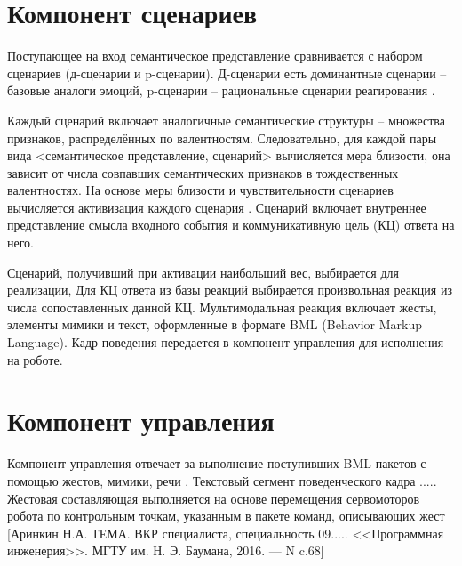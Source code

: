 \clearpage

\section{Компонент сценариев}

Поступающее на вход семантическое представление сравнивается с набором сценариев (д-сценарии и p-сценарии). Д-сценарии есть доминантные сценарии -- базовые аналоги эмоций, p-сценарии -- рациональные сценарии реагирования \cite{arch_of_the_robot_4}. 

Каждый сценарий включает аналогичные семантические структуры -- множества признаков, распределённых по валентностям. %
Следовательно, для каждой пары вида <семантическое представление, сценарий> вычисляется мера близости, она зависит от числа совпавших семантических признаков в тождественных валентностях. На основе меры близости и чувствительности сценариев вычисляется активизация каждого сценария \cite{arch_of_the_robot_5}. Сценарий включает внутреннее представление смысла входного события и коммуникативную цель (КЦ) ответа на него.

Сценарий, получивший при активации наибольший вес, выбирается для реализации, Для КЦ ответа из базы реакций выбирается произвольная реакция из числа сопоставленных данной КЦ. Мультимодальная реакция включает жесты, элементы мимики и текст, оформленные в формате BML (Behavior Markup Language). Кадр поведения  передается в компонент управления для исполнения на роботе.

\section{Компонент управления}

Компонент управления отвечает за выполнение поступивших BML-пакетов с помощью жестов, мимики, речи \cite{arch_of_the_robot}. Текстовый сегмент поведенческого кадра .....
Жестовая составляющая выполняется на основе перемещения сервомоторов робота по контрольным точкам, указанным в пакете команд, описывающих жест [Аринкин Н.А. ТЕМА. ВКР специалиста, специальность 09..... <<Программная инженерия>>. МГТУ им. Н. Э. Баумана, 2016. --- N c.68]